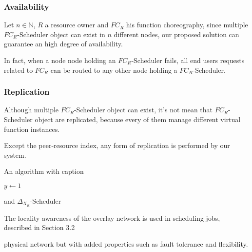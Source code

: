 \documentclass[10pt,a4paper]{article}
\theoremstyle{definition}
\begin{document}
\subsubsection{Availability}

Let $n \in \mathbb{N}$, $R$ a resource owner and $FC_R$ his function choreography, since multiple $FC_R$-Scheduler object can exist in $n$ different nodes, our proposed solution can guarantee an high degree of availability. 

In fact, when a node node holding an $FC_R$-Scheduler fails, all end users requests related to $FC_R$ can be routed to any other node holding a $FC_R$-Scheduler. 

\subsubsection{Replication}

Although multiple $FC_R$-Scheduler object can exist, it's not mean that $FC_R$-Scheduler object are replicated, because every of them manage different virtual function instances. 

Except the peer-resource index, any form of replication is performed by our system.







\begin{algorithm}
\caption{An algorithm with caption}\label{alg:cap}
\begin{algorithmic}

\State $y \gets 1$


\end{algorithmic}
\end{algorithm}




 and $\Delta_{X_{R}}$-Scheduler








The locality awareness of the overlay network is used in scheduling jobs, described in Section 3.2







physical network but with added properties such as fault tolerance and flexibility. 
\end{document}
